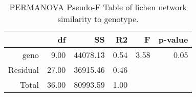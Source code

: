 \begin{table}[ht]
\centering
\begin{tabular}{rrrrrr}
  \hline
 & df & SS & R2 & F & p-value \\ 
  \hline
geno & 9.00 & 44078.13 & 0.54 & 3.58 & 0.05 \\ 
  Residual & 27.00 & 36915.46 & 0.46 &  &  \\ 
  Total & 36.00 & 80993.59 & 1.00 &  &  \\ 
   \hline
\end{tabular}
\caption{PERMANOVA Pseudo-F Table of lichen network similarity to genotype.} 
\label{tab:cn_perm}
\end{table}
